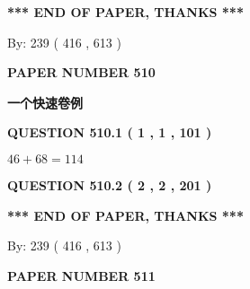 \documentclass{ctexart}
\begin{document}
   
   
\vspace{1.0in} 
{\textbf{\large{ *** END OF PAPER, THANKS *** }}} 
   
   
\hspace{1.0in} By: 
 239 ( 416 ,  613 )
   
   
   
   
\newpage 
\setcounter{page}{ 
   510001 } 
   
   
   
   
 {\textbf{ \Large{ PAPER NUMBER  510  }}}
   
   
\vspace{0.2in}
   
   
   
   
   
   
 \vspace{0.2in}
{\LARGE {\textbf{ 一个快速卷例}}}
   
   
  
\vspace{0.2in}
  
{\textbf{\Large{QUESTION
510.1 
 ( 1 , 1 , 101 )
}}}
  
  
 
 

$ %
46 +  %
68=   %
114$
 
 
  
\vspace{0.2in}
  
{\textbf{\Large{QUESTION
510.2 
 ( 2 , 2 , 201 )
}}}
  
  
   
   
 \vspace{0.2in}
 
   
   
   
   
\vspace{1.0in} 
{\textbf{\large{ *** END OF PAPER, THANKS *** }}} 
   
   
\hspace{1.0in} By: 
 239 ( 416 ,  613 )
   
   
   
   
\newpage 
\setcounter{page}{ 
   511001 } 
   
   
   
   
 {\textbf{ \Large{ PAPER NUMBER  511  }}}
   
   
\vspace{0.2in}
   
\end{document}

